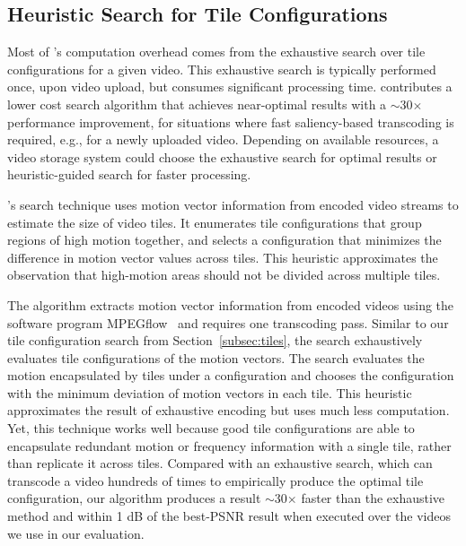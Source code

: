 \subsection{Heuristic Search for Tile Configurations}
\label{subsec:search-algo}

Most of \name's computation overhead comes from the exhaustive search over tile configurations for a given video.
This exhaustive search is typically performed once, upon video upload, but consumes significant processing time.
\nameStore contributes a lower cost search algorithm that achieves near-optimal results with a $\sim$30$\times$ performance improvement, for situations where fast saliency-based transcoding is required, e.g., for a newly uploaded video.
Depending on available resources, a video storage system could choose the exhaustive search for optimal results or heuristic-guided search for faster processing.

\name's search technique uses motion vector information from encoded video streams to estimate the size of video tiles.
It enumerates tile configurations that group regions of high motion together, and selects a configuration that minimizes the difference in motion vector values across tiles.
This heuristic approximates the observation that high-motion areas should not be divided across multiple tiles.

The algorithm extracts motion vector information from encoded videos using the software program {{MPEGflow}}~\cite{mpegflow} and requires one transcoding pass.
Similar to our tile configuration search from Section~\ref{subsec:tiles}, the search exhaustively evaluates tile configurations of the motion vectors.
The search evaluates the motion encapsulated by tiles under a configuration and chooses the configuration with the minimum deviation of motion vectors in each tile.
This heuristic approximates the result of exhaustive encoding but uses much less computation.
Yet, this technique works well because good tile configurations are able to encapsulate redundant motion or frequency information with a single tile, rather than replicate it across tiles.
Compared with an exhaustive search, which can transcode a video hundreds of times to empirically produce the optimal tile configuration, our algorithm produces a result $\sim$30$\times$ faster than the exhaustive method and within 1 dB of the best-PSNR result when executed over the videos we use in our evaluation.
